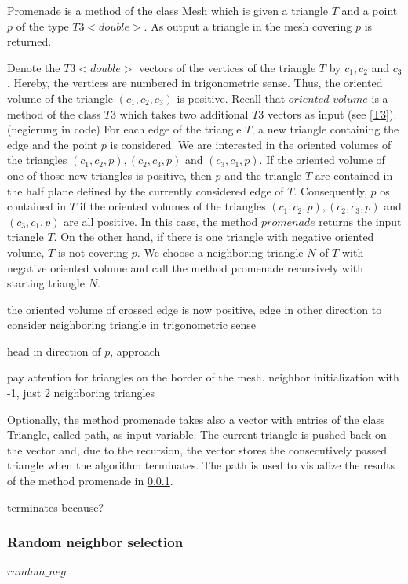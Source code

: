 \documentclass[10pt]{article}
\begin{document}
Promenade is a method of the class Mesh which is given a triangle $T$ and a point $p$ of the type $T3<double>$. As output a triangle in the mesh covering $p$ is returned. 

Denote the $T3<double>$ vectors of the vertices of the triangle $T$ by $c_1,c_2$ and $c_3$. Hereby, the vertices are numbered in trigonometric sense. Thus, the oriented volume of the triangle $(c_1,c_2,c_3)$ is positive. Recall that $oriented\_volume$ is a method of the class $T3$ which takes two additional $T3$ vectors as input (see \ref{T3}). (negierung in code) For each edge of the triangle $T$, a new triangle containing the edge and the point $p$ is considered. We are interested in the oriented volumes of the triangles $(c_1,c_2,p), (c_2,c_3,p)$ and $(c_3,c_1,p)$. If the oriented volume of one of those new triangles is positive, then $p$ and the triangle $T$ are contained in the half plane defined by the currently considered edge of $T$. Consequently, $p$ os contained in $T$ if the oriented volumes of the triangles $(c_1,c_2,p), (c_2,c_3,p)$ and $(c_3,c_1,p)$ are all positive. In this case, the method $promenade$ returns the input triangle $T$. On the other hand, if there is one triangle with negative oriented volume, $T$ is not covering $p$. We choose a neighboring triangle $N$ of $T$ with negative oriented volume and call the method promenade recursively with starting triangle $N$.

the oriented volume of crossed edge is now positive, edge in other direction to consider neighboring triangle in trigonometric sense

head in direction of $p$, approach

pay attention for triangles on the border of the mesh. neighbor initialization with -1, just 2 neighboring triangles

Optionally, the method promenade takes also a vector with entries of the class Triangle, called path, as input variable. The current triangle is pushed back on the vector and, due to the recursion, the vector stores the consecutively passed triangle when the algorithm terminates. The path is used to visualize the results of the method promenade in \ref{}.

terminates because?

\subsubsection{Random neighbor selection}

$ random\_neg $
\end{document}
